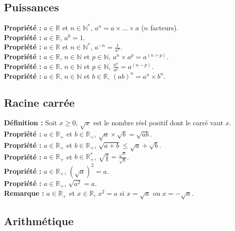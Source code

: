\documentclass[a4paper,titlepage]{article}
\begin{document}
    \subsection{Puissances}
        \textbf{Propriété :} $a\in\mathbb{R}$ et $n\in\mathbb{N}^{*}$, $a^{n}=a\times\ldots\times a$ ($n$ facteurs).
        \\
        \textbf{Propriété :} $a\in\mathbb{R}$, $a^{0}=1$.
        \\
        \textbf{Propriété :} $a\in\mathbb{R}$ et $n\in\mathbb{N}^{*}$, $a^{-n}=\frac{1}{a^{n}}$.
        \\
        \textbf{Propriété :} $a\in\mathbb{R}$, $n\in\mathbb{N}$ et $p\in\mathbb{N}$, $a^{n}\times a^{p}=a^{\left(n+p\right)}$.
        \\
        \textbf{Propriété :} $a\in\mathbb{R}$, $n\in\mathbb{N}$ et $p\in\mathbb{N}$, $\frac{a^{n}}{a^{p}}=a^{\left(n-p\right)}$.
        \\
        \textbf{Propriété :} $a\in\mathbb{R}$, $n\in\mathbb{N}$ et $b\in\mathbb{R}$, $\left(ab\right)^{n}=a^{n}\times b^{n}$.
    \subsection{Racine carrée}
        \textbf{Définition :} Soit $x\geqslant0$, $\sqrt{x}$ est le nombre réel positif dont le carré vaut $x$.
        \\
        \textbf{Propriété :} $a\in\mathbb{R}_{+}$ et $b\in\mathbb{R}_{+}$, $\sqrt{a}\times\sqrt{b}=\sqrt{ab}$.
        \\
        \textbf{Propriété :} $a\in\mathbb{R}_{+}$ et $b\in\mathbb{R}_{+}$, $\sqrt{a+b}\leqslant\sqrt{a}+\sqrt{b}$.
        \\
        \textbf{Propriété :} $a\in\mathbb{R}_{+}$ et $b\in\mathbb{R}^{*}_{+}$, $\sqrt{\frac{a}{b}}=\frac{\sqrt{a}}{\sqrt{b}}$.
        \\
        \textbf{Propriété :} $a\in\mathbb{R}_{+}$, $\left(\sqrt{a}\right)^\mathrm{2}=a$.
        \\
        \textbf{Propriété :} $a\in\mathbb{R}_{+}$, $\sqrt{a^{2}}=a$.
        \\
        \textbf{Remarque :} $a\in\mathbb{R}_\mathrm{+}$ et $x\in\mathbb{R}$, $x^{2}=a$ si $x=\sqrt{a}$ ou $x=-\sqrt{a}$.
    \subsection{Arithmétique}
\end{document}
